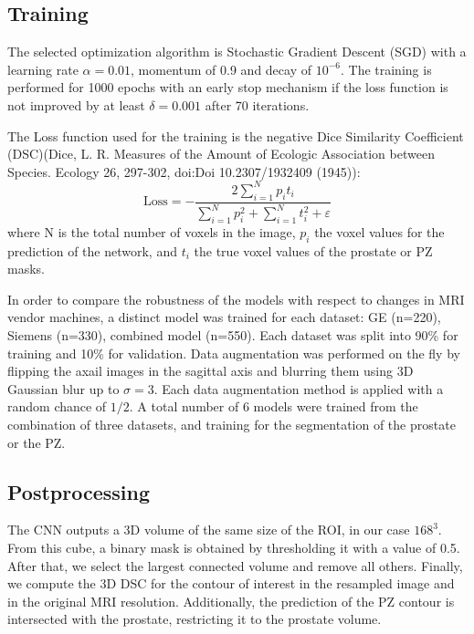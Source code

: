 \subsection{Training}
\label{subsec:training}
The selected optimization algorithm is Stochastic Gradient Descent (SGD) with a learning rate $\alpha = 0.01$, momentum of 0.9 and decay of $10^{-6}$. The training is performed for 1000 epochs with an early stop mechanism if the loss function is not improved by at least $\delta = 0.001$ after 70 iterations. 

The Loss function used for the training is the negative Dice Similarity Coefficient (DSC)(Dice, L. R. Measures of the Amount of Ecologic Association between Species. Ecology 26, 297-302, doi:Doi 10.2307/1932409 (1945)):  
\begin{equation}
\text{Loss} = - \frac{2 \sum_{i=1}^{N}p_it_i}{\sum_{i=1}^{N}p_i^2 + \sum_{i=1}^{N}t_i^2 + \varepsilon} 
\label{eq:dsc}
\end{equation}
where N is the total number of voxels in the image, $p_i$ the voxel values for the prediction of the network, and $t_i$ the true voxel values of the prostate or PZ masks.

In order to compare the robustness of the models with respect to changes in MRI vendor machines,  a distinct model was trained for each dataset: GE (n=220), Siemens (n=330), combined model (n=550). Each dataset was split into 90\% for training and 10\% for validation. Data augmentation was performed on the fly by flipping the axail images in the sagittal axis and blurring them using 3D Gaussian blur up to $\sigma = 3$. Each data augmentation method is applied with a random chance of $1/2$.  
A total number of 6 models were trained from the combination of three datasets, and training for the segmentation of the prostate or the PZ. 

\subsection{Postprocessing}
The CNN outputs a 3D volume of the same size of the ROI, in our case $168^3$. From this cube, a binary mask is obtained by thresholding it with a value of 0.5. After that, we select the largest connected volume and remove all others. Finally, we compute the 3D DSC for the contour of interest in the resampled image and in the original MRI resolution. Additionally, the prediction of the PZ contour is intersected with the prostate, restricting it to the prostate volume.


